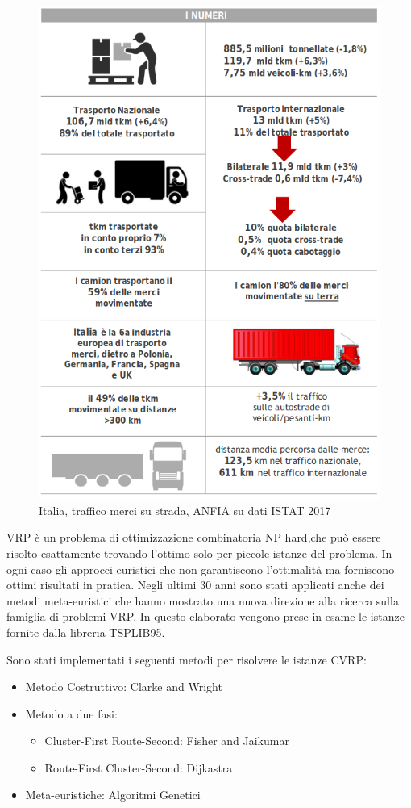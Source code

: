 \documentclass[]{article}
\begin{document}
\begin{figure}[h!]
	\centering
	\includegraphics[scale=0.50]{images/ITA28.png}
	\caption{ Italia, traffico merci su strada, ANFIA su dati ISTAT 2017 }
	\label{fig:ITA28}
\end{figure}

VRP è un problema di ottimizzazione combinatoria NP hard,che può essere risolto esattamente trovando l'ottimo solo per piccole istanze del problema. In ogni caso gli approcci euristici che non garantiscono l'ottimalità ma forniscono ottimi risultati in pratica.
Negli ultimi 30 anni sono stati applicati anche dei metodi meta-euristici che hanno mostrato una nuova direzione alla ricerca sulla famiglia di problemi VRP.
In questo elaborato vengono prese in esame le istanze fornite dalla libreria TSPLIB95\cite{TSPLIB95}.

Sono stati implementati i seguenti metodi per risolvere le istanze CVRP:
\begin{itemize}
	\item Metodo Costruttivo: Clarke and Wright
	\item Metodo a due fasi:
	\begin{itemize}
		\item Cluster-First Route-Second: Fisher and Jaikumar
		\item Route-First Cluster-Second: Dijkastra
	\end{itemize}
	\item Meta-euristiche: Algoritmi Genetici
\end{itemize}
\end{document}
